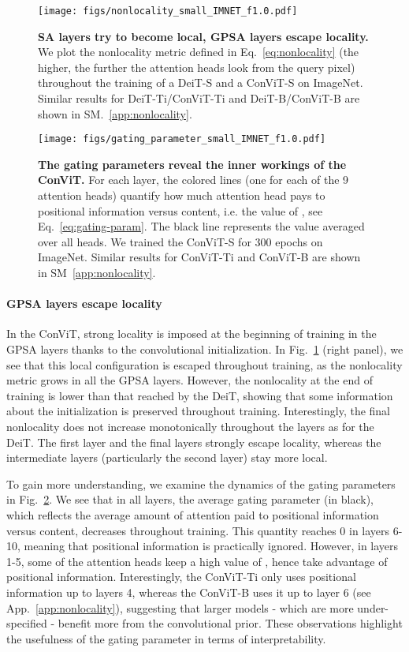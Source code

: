 \documentclass[a4paper,11pt,twocolumn]{article}
\begin{document}
\begin{figure}[t]
    \centering
    \texttt{[image: figs/nonlocality\_small\_IMNET\_f1.0.pdf]}
    \caption{\textbf{SA layers try to become local, GPSA layers escape locality.} We plot the nonlocality metric defined in Eq.~\ref{eq:nonlocality} (the higher, the further the attention heads look from the query pixel) throughout the training of a DeiT-S and a ConViT-S on ImageNet. Similar results for DeiT-Ti/ConViT-Ti and DeiT-B/ConViT-B are shown in SM.~\ref{app:nonlocality}.}
    \label{fig:nonlocality}
\end{figure}

\begin{figure}[t]
    \centering
    \texttt{[image: figs/gating\_parameter\_small\_IMNET\_f1.0.pdf]}
    \caption{\textbf{The gating parameters reveal the inner workings of the ConViT.} For each layer, the colored lines (one for each of the 9 attention heads) quantify how much attention head  pays to positional information versus content, i.e. the value of , see Eq.~\ref{eq:gating-param}. The black line represents the value averaged over all heads. We trained the ConViT-S for 300 epochs on ImageNet. Similar results for ConViT-Ti and ConViT-B are shown in SM~\ref{app:nonlocality}.}
    \label{fig:gating}
\end{figure}

\paragraph{GPSA layers escape locality}

In the ConViT, strong locality is imposed at the beginning of training in the GPSA layers thanks to the convolutional initialization. In Fig.~\ref{fig:nonlocality} (right panel), we see that this local configuration is escaped throughout training, as the nonlocality metric grows in all the GPSA layers. However, the nonlocality at the end of training is lower than that reached by the DeiT, showing that some information about the initialization is preserved throughout training. Interestingly, the final nonlocality does not increase monotonically throughout the layers as for the DeiT. The first layer and the final layers strongly escape locality, whereas the intermediate layers (particularly the second layer) stay more local. 

To gain more understanding, we examine the dynamics of the gating parameters in Fig.~\ref{fig:gating}. We see that in all layers, the average gating parameter  (in black), which reflects the average amount of attention paid to positional information versus content, decreases throughout training. This quantity reaches 0 in layers 6-10, meaning that positional information is practically ignored. However, in layers 1-5, some of the attention heads keep a high value of 
, hence take advantage of positional information. Interestingly, the ConViT-Ti only uses positional information up to layers 4, whereas the ConViT-B uses it up to layer 6 (see App.~\ref{app:nonlocality}), suggesting that larger models - which are more under-specified - benefit more from the convolutional prior. These observations highlight the usefulness of the gating parameter in terms of interpretability.
\end{document}
